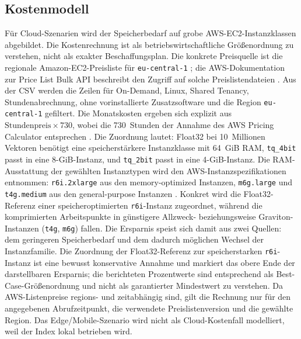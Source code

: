 \subsection{Kostenmodell}
%
Für Cloud-Szenarien wird der Speicherbedarf auf grobe AWS-EC2-Instanzklassen abgebildet.
Die Kostenrechnung ist als betriebswirtschaftliche Größenordnung zu verstehen, nicht als exakter Beschaffungsplan.
Die konkrete Preisquelle ist die regionale Amazon-EC2-Preisliste für \texttt{eu-central-1} \cite{aws_ec2_price_list_eu_central_1}; die AWS-Dokumentation zur Price List Bulk API beschreibt den Zugriff auf solche Preislistendateien \cite{aws_price_list_bulk_api}. Aus der CSV werden die Zeilen für On-Demand, Linux, Shared Tenancy, Stundenabrechnung, ohne vorinstallierte Zusatzsoftware und die Region \texttt{eu-central-1} gefiltert. Die Monatskosten ergeben sich explizit aus $\text{Stundenpreis} \times 730$, wobei die 730~Stunden der Annahme des AWS Pricing Calculator entsprechen \cite{aws_pricing_calculator_assumptions}.
Die Zuordnung lautet: Float32 bei 10~Millionen Vektoren benötigt eine speicherstärkere Instanzklasse mit 64~GiB RAM, \texttt{tq\_4bit} passt in eine 8-GiB-Instanz, und \texttt{tq\_2bit} passt in eine 4-GiB-Instanz.
Die RAM-Ausstattung der gewählten Instanztypen wird den AWS-Instanzspezifikationen entnommen: \texttt{r6i.2xlarge} aus den memory-optimized Instanzen, \texttt{m6g.large} und \texttt{t4g.medium} aus den general-purpose Instanzen \cite{aws_ec2_memory_optimized_specs,aws_ec2_general_purpose_specs}.
Konkret wird die Float32-Referenz einer speicheroptimierten \texttt{r6i}-Instanz zugeordnet, während die komprimierten Arbeitspunkte in günstigere Allzweck- beziehungsweise Graviton-Instanzen (\texttt{t4g}, \texttt{m6g}) fallen.
Die Ersparnis speist sich damit aus zwei Quellen: dem geringeren Speicherbedarf und dem dadurch möglichen Wechsel der Instanzfamilie.
Die Zuordnung der Float32-Referenz zur speicherstarken \texttt{r6i}-Instanz ist eine bewusst konservative Annahme und markiert das obere Ende der darstellbaren Ersparnis; die berichteten Prozentwerte sind entsprechend als Best-Case-Größenordnung und nicht als garantierter Mindestwert zu verstehen.
Da AWS-Listenpreise regions- und zeitabhängig sind, gilt die Rechnung nur für den angegebenen Abrufzeitpunkt, die verwendete Preislistenversion und die gewählte Region.
Das Edge/Mobile-Szenario wird nicht als Cloud-Kostenfall modelliert, weil der Index lokal betrieben wird.
%
